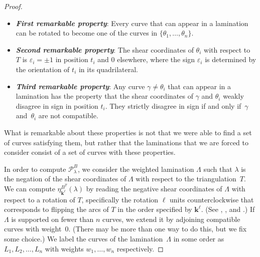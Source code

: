 \documentclass[10pt]{article}
\theoremstyle{definition}
\theoremstyle{remark}
\numberwithin{equation}{section}
\newcommand{\newword}[1]{\textbf{\emph{#1}}}
\newcommand{\ep}{\varepsilon}
\newcommand{\set}[1]{{\lbrace #1 \rbrace}}
\newcommand{\0}{{\mathbf{0}}}
\newcommand{\kk}{{\boldsymbol{k}}}
\renewcommand{\P}{\mathcal{P}}
\begin{document}
\begin{proof}
\begin{itemize}
\item
\newword{First remarkable property}:
Every curve that can appear in a lamination can be rotated to become one of the curves in $\set{\theta_1,\ldots,\theta_n}$.
\item
\newword{Second remarkable property}:
The shear coordinates of $\theta_i$ with respect to~$T$ is $\ep_i=\pm1$ in position $t_i$ and $0$ elsewhere, where the sign $\ep_i$ is determined by the orientation of $t_i$ in its quadrilateral.
\item
\newword{Third remarkable property}:
Any curve $\gamma\neq\theta_i$ that can appear in a lamination has the property that the shear coordinates of $\gamma$ and $\theta_i$ weakly disagree in sign in position $t_i$.
They strictly disagree in sign if and only if~$\gamma$ and~$\theta_i$ are not compatible.
\end{itemize}
What is remarkable about these properties is not that we were able to find a set of curves satisfying them, but rather that the laminations that we are forced to consider consist of a set of curves with these properties.

In order to compute $\P^B_\lambda$, we consider the weighted lamination $\Lambda$ such that $\lambda$ is the negation of the shear coordinates of $\Lambda$ with respect to the triangulation~$T$.
We can compute $\eta^{B^T}_{\kk^\ell}(\lambda)$ by reading the negative shear coordinates of $\Lambda$ with respect to a rotation of $T$, specifically the rotation $\ell$ units counterclockwise that corresponds to flipping the arcs of $T$ in the order specified by $\kk^\ell$.
(See \cite[Theorem~12.6]{cats2}, \cite[Theorem~4.3]{unisurface}, and \cite[Section~5]{unisurface}.)
If $\Lambda$ is supported on fewer than $n$ curves, we extend it by adjoining compatible curves with weight~$0$.
(There may be more than one way to do this, but we fix some choice.)
We label the curves of the lamination~$\Lambda$ in some order as $L_1,L_2,\ldots,L_n$ with weights $w_1,\ldots,w_n$ respectively.


\end{proof}
\end{document}
